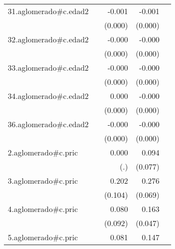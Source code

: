 {\begin{longtable}{l*{4}{D{.}{.}{-1}}}
\addlinespace
31.aglomerado#c.edad2&                     &      -0.001\sym{***}&      -0.001\sym{***}&                     \\
            &                     &     (0.000)         &     (0.000)         &                     \\
\addlinespace
32.aglomerado#c.edad2&                     &      -0.000         &      -0.000\sym{***}&                     \\
            &                     &     (0.000)         &     (0.000)         &                     \\
\addlinespace
33.aglomerado#c.edad2&                     &      -0.000         &      -0.000\sym{***}&                     \\
            &                     &     (0.000)         &     (0.000)         &                     \\
\addlinespace
34.aglomerado#c.edad2&                     &       0.000         &      -0.000\sym{**} &                     \\
            &                     &     (0.000)         &     (0.000)         &                     \\
\addlinespace
36.aglomerado#c.edad2&                     &      -0.000         &      -0.000\sym{**} &                     \\
            &                     &     (0.000)         &     (0.000)         &                     \\
\addlinespace
2.aglomerado#c.pric&                     &       0.000         &       0.094         &                     \\
            &                     &         (.)         &     (0.077)         &                     \\
\addlinespace
3.aglomerado#c.pric&                     &       0.202         &       0.276\sym{***}&                     \\
            &                     &     (0.104)         &     (0.069)         &                     \\
\addlinespace
4.aglomerado#c.pric&                     &       0.080         &       0.163\sym{***}&                     \\
            &                     &     (0.092)         &     (0.047)         &                     \\
\addlinespace
5.aglomerado#c.pric&                     &       0.081         &       0.147\sym{*}  &                     \\

\end{longtable}}
